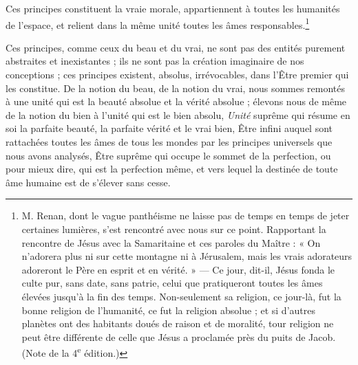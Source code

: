 \documentclass[a4paper, 11pt, oneside]{article}
\begin{document}
Ces principes constituent la vraie morale, appartiennent à toutes les humanités de l'espace, et relient dans la même unité toutes les âmes responsables.\footnote{M. Renan, dont le vague panthéisme ne laisse pas de temps en temps de jeter certaines lumières, s'est rencontré avec nous sur ce point. Rapportant la rencontre de Jésus avec la Samaritaine et ces paroles du Maître : « On n'adorera plus ni sur cette montagne ni à Jérusalem, mais les vrais adorateurs adoreront le Père en esprit et en vérité. » --- Ce jour, dit-il, Jésus fonda le culte pur, sans date, sans patrie, celui que pratiqueront toutes les âmes élevées jusqu'à la fin des temps. Non-seulement sa religion, ce jour-là, fut la bonne religion de l'humanité, ce fut la religion absolue ; et si d'autres planètes ont des habitants doués de raison et de moralité, tour religion ne peut être différente de celle que Jésus a proclamée près du puits de Jacob. (Note de la 4\textsuperscript{e} édition.)}

Ces principes, comme ceux du beau et du vrai, ne sont pas des entités purement abstraites et inexistantes ; ils ne sont pas la création imaginaire de nos conceptions ; ces principes existent, absolus, irrévocables, dans l'Être premier qui les constitue. De la notion du beau, de la notion du vrai, nous sommes remontés à une unité qui est la beauté absolue et la vérité absolue ; élevons nous de même de la notion du bien à l'unité qui est le bien absolu, \emph{Unité} suprême qui résume en soi la parfaite beauté, la parfaite vérité et le vrai bien, Être infini auquel sont rattachées toutes les âmes de tous les mondes par les principes universels que nous avons analysés, Être suprême qui occupe le sommet de la perfection, ou pour mieux dire, qui est la perfection même, et vers lequel la destinée de toute âme humaine est de s'élever sans cesse.
\end{document}
